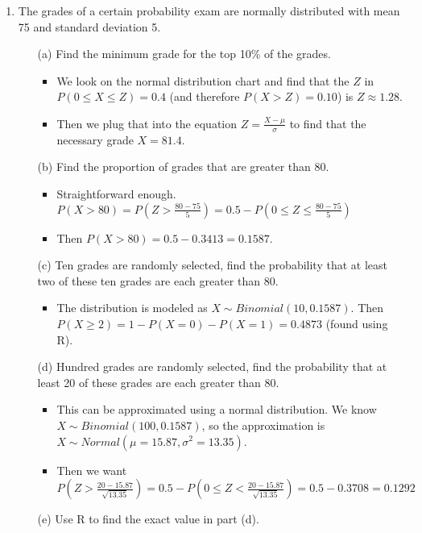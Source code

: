 \documentclass{article}
\begin{document}
\begin{enumerate}
\item The grades of a certain probability exam are normally distributed with mean 75 and standard deviation 5.
    \begin{itemize}
    \item [(a)] Find the minimum grade for the top 10\% of the grades.
        \begin{itemize}
        \item We look on the normal distribution chart and find that the $Z$ in $P(0 \leq X \leq Z) = 0.4$ (and therefore $P(X > Z) = 0.10$) is $Z \approx 1.28$.
        \item Then we plug that into the equation $Z = \frac{X - \mu}{\sigma}$ to find that the necessary grade $X = 81.4$.
        \end{itemize}
    \item [(b)] Find the proportion of grades that are greater than 80.
        \begin{itemize}
        \item Straightforward enough. $P(X > 80) = P(Z > \frac{80 - 75}{5}) = 0.5 - P(0 \leq Z \leq \frac{80 - 75}{5})$
        \item Then $P(X > 80) = 0.5 - 0.3413 = 0.1587$.
        \end{itemize}
    \item [(c)] Ten grades are randomly selected, find the probability that at least two of these ten grades are each greater than 80.
        \begin{itemize}
        \item The distribution is modeled as $X \sim Binomial(10, 0.1587)$. Then $P(X \geq 2) = 1 - P(X = 0) - P(X = 1) = 0.4873$ (found using R).
        \end{itemize}
    \item [(d)] Hundred grades are randomly selected, find the probability that at least 20 of these grades are each greater than 80.
        \begin{itemize}
        \item This can be approximated using a normal distribution. We know $X \sim Binomial(100, 0.1587)$, so the approximation is $X \sim Normal(\mu = 15.87, \sigma^2 = 13.35)$.
        \item Then we want $P(Z > \frac{20 - 15.87}{\sqrt{13.35}}) = 0.5 - P(0 \leq Z < \frac{20 - 15.87}{\sqrt{13.35}}) = 0.5 - 0.3708 = 0.1292$
        \end{itemize}
    \item [(e)] Use R to find the exact value in part (d).

\end{itemize}
\end{enumerate}
\end{document}
